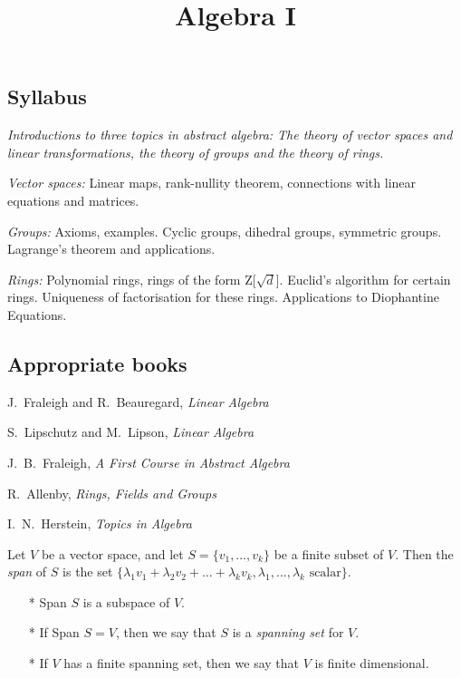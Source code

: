 \documentclass[10pt]{scrartcl}
\title{Algebra I}
\begin{document}
{


\subsection*{Syllabus}

\textit{Introductions to three topics in abstract algebra: The theory of vector spaces and linear
transformations, the theory of groups and the theory of rings.}


\emph{Vector spaces:} Linear maps, rank-nullity theorem, connections with linear equations and matrices.

\emph{Groups:} Axioms, examples. Cyclic groups, dihedral groups, symmetric groups. Lagrange’s  theorem and applications.

\emph{Rings:}  Polynomial rings, rings of the form Z[$\sqrt{d}$]. Euclid’s algorithm for certain rings. Uniqueness of factorisation for these rings. Applications to Diophantine Equations.


\subsection*{Appropriate books}

{\shortskip
J.~Fraleigh and R.~Beauregard, \emph{Linear Algebra}

S.~Lipschutz and M.~Lipson, \emph{Linear Algebra}

J.~B.~Fraleigh, \emph{A First Course in Abstract Algebra}

R.~Allenby, \emph{Rings, Fields and Groups}

I.~N.~Herstein, \emph{Topics in Algebra}
}}

\TableofContents


\setcounter{lecture}{1}
\pagebreak
{}
\setcounter{page}{3}

Let   $V$ be a vector space, and let $S = \{v_1, \dots, v_k\}$ be a finite subset of $V$. Then the \emph{span} of $S$ is the set $\{\lambda_1v_1 + \lambda_2v_2 + \dots + \lambda_kv_k, \lambda_1,\dots,\lambda_k \text{ scalar}\}.$

\begin{itemize}
\item[*] Span $S$ is a subspace of $V$.
\item[*] If Span $S = V$, then we say that $S$ is a \emph{spanning set} for $V$. 
\item[*] If $V$ has a finite spanning set, then we say that $V$ is finite dimensional.
\end{itemize}
\end{document}
